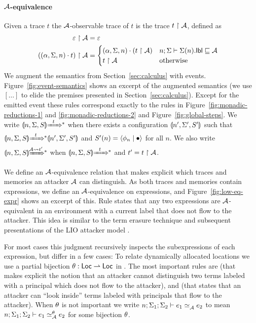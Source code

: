 \paragraph{$\mathcal{A}$-equivalence}
Given a trace $t$ the $\mathcal{A}$-observable trace of $t$ is the trace $t \upharpoonright \mathcal{A}$, defined as
\begin{align*}
\varepsilon \upharpoonright \mathcal{A} &= \varepsilon\\
((\alpha, \Sigma, n) \cdot t) \upharpoonright \mathcal{A} &=
\begin{cases}
(\alpha, \Sigma, n) \cdot (t \upharpoonright \mathcal{A}) & n; \Sigma \vdash \Sigma(n).\mathsf{lbl} \sqsubseteq \mathcal{A} \\
t \upharpoonright \mathcal{A} & \text{otherwise}
\end{cases}
\end{align*}
We augment the semantics from Section~\ref{sec:calculus} with events. Figure~\ref{fig:event-semantics} shows an excerpt of the augmented semantics (we use $[\ldots]$ to elide the premises presented in Section~\ref{sec:calculus}). Except for the emitted event these rules correspond exactly to the rules in Figure~\ref{fig:monadic-reductions-1} and \ref{fig:monadic-reductions-2} and Figure~\ref{fig:global-steps}. We write $\gconfig{n}{\env}{S} \gstepstos[][t]$ when there exists a configuration $\llparenthesis n', \Sigma', S' \rrparenthesis$ such that $\gconfig{n}{\env}{S} \gstepstos[][t] \gconfig{n'}{\env'}{S'}$ and $S'(n) = \langle \phi_n \mid \bullet \rangle$ for all $n$. We also write $\gconfig{n}{\env}{S} \gstepstos[][\Attacker \filtertrace t']$ when $\gconfig{n}{\env}{S} \gstepstos[][t]$ and $t' = t \upharpoonright \mathcal{A}$.

We define an $\mathcal{A}$-equivalence relation that makes explicit which traces and memories an attacker $\mathcal{A}$ can distinguish. As both traces and memories contain expressions, we define an $\mathcal{A}$-equivalence on expressions, and Figure~\ref{fig:low-eq-expr} shows an excerpt of this. Rule  states that any two expressions are $\mathcal{A}$-equivalent in an environment with a current label that does not flow to the attacker. This idea is similar to the term erasure technique \cite{SRMMlio} and subsequent presentations of the LIO attacker model \cite{Stefan:2012:ACT:2364527.2364557, 10.1007/978-3-642-40203-6_40, 10.1007/978-3-319-24858-5_13}.

For most cases this judgment recursively inspects the subexpressions of each expression, but differ in a few cases: To relate dynamically allocated locations we use a partial bijection \cite{Banerjee:2002:SIF:794201.795164, Rajani2018} $\theta: \mathsf{Loc} \rightharpoonup \mathsf{Loc}$ in . The most important rules are  (that makes explicit the notion that an attacker cannot distinguish two terms labeled with a principal which does not flow to the attacker), and  (that states that an attacker can ``look inside'' terms labeled with principals that flow to the attacker). When $\theta$ is not important we write $\loweq{n; \env_1; \env_2}{\Attacker}{\expr_1}{\expr_2}$ to mean $\loweq{n; \env_1; \env_2}{\Attacker}[\bijection]{\expr_1}{\expr_2}$ for some bijection $\theta$.

